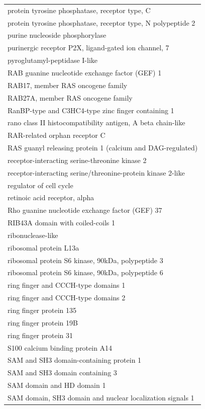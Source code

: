 \documentclass[english]{article}\usepackage[]{graphicx}\usepackage[]{color}
\begin{document}
\begin{longtable}{l}
protein tyrosine phosphatase, receptor type, C \\ 
protein tyrosine phosphatase, receptor type, N polypeptide 2 \\ 
purine nucleoside phosphorylase \\ 
purinergic receptor P2X, ligand-gated ion channel, 7 \\ 
pyroglutamyl-peptidase I-like \\ 
RAB guanine nucleotide exchange factor (GEF) 1 \\ 
RAB17, member RAS oncogene family \\ 
RAB27A, member RAS oncogene family \\ 
RanBP-type and C3HC4-type zinc finger containing 1 \\ 
rano class II histocompatibility antigen, A beta chain-like \\ 
RAR-related orphan receptor C \\ 
RAS guanyl releasing protein 1 (calcium and DAG-regulated) \\ 
receptor-interacting serine-threonine kinase 2 \\ 
receptor-interacting serine/threonine-protein kinase 2-like \\ 
regulator of cell cycle \\ 
retinoic acid receptor, alpha \\ 
Rho guanine nucleotide exchange factor (GEF) 37 \\ 
RIB43A domain with coiled-coils 1 \\ 
ribonuclease-like \\ 
ribosomal protein L13a \\ 
ribosomal protein S6 kinase, 90kDa, polypeptide 3 \\ 
ribosomal protein S6 kinase, 90kDa, polypeptide 6 \\ 
ring finger and CCCH-type domains 1 \\ 
ring finger and CCCH-type domains 2 \\ 
ring finger protein 135 \\ 
ring finger protein 19B \\ 
ring finger protein 31 \\ 
S100 calcium binding protein A14 \\ 
SAM and SH3 domain-containing protein 1 \\ 
SAM and SH3 domain containing 3 \\ 
SAM domain and HD domain 1 \\ 
SAM domain, SH3 domain and nuclear localization signals 1 \\ 

\end{longtable}
\end{document}
